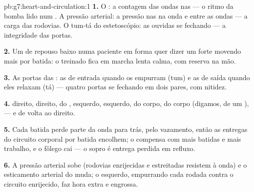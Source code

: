 \begin{solution}{pb:g7:heart-and-circulation:1}
\textbf{1.} O : a contagem das ondas nas  --- o ritmo da
bomba lido num . A pressão arterial: a pressão nas  na
onda e entre as ondas --- a carga das rodovias. O tum-tá do
estetoscópio: as  ouvidas se fechando --- a integridade das
portas.

\textbf{2.} Um  de repouso baixo numa paciente em forma quer
dizer um  forte movendo mais  por batida: o 
treinado fica em marcha lenta calma, com reserva na mão.

\textbf{3.} As portas das : as  de entrada quando os
 empurram (tum) e as de saída quando eles relaxam (tá) ---
quatro portas se fechando em dois pares, com nitidez.

\textbf{4.}  direito,  direito,  do ,
 esquerdo,  esquerdo,  do corpo,  do
corpo (digamos, de um ),  --- e de volta ao  direito.

\textbf{5.} Cada batida perde parte da onda para trás, pelo
vazamento, então as entregas do circuito corporal por batida
encolhem; o  compensa com mais batidas e mais trabalho, e o
fôlego cai --- o sopro é entrega perdida em refluxo.

\textbf{6.} A pressão arterial sobe (rodovias enrijecidas e
estreitadas resistem à onda) e o esticamento arterial do  muda; o
 esquerdo, empurrando cada rodada contra o circuito
enrijecido, faz hora extra e engrossa.


\end{solution}
